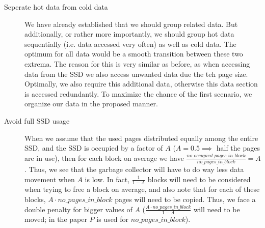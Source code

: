 \documentclass[../../main.tex]{subfiles}
\begin{document}
\begin{description}
    \item[Seperate hot data from cold data] We have already established that we should group related data. But additionally, or rather more importantly, we should group hot data sequentially (i.e. data accessed very often) as well as cold data. The optimum for all data would be a smooth transition between these two extrema. The reason for this is very similar as before, as when accessing data from the SSD we also access unwanted data due the teh page size. Optimally, we also require this additional data, otherwise this data section is accessed redundantly. To maximize the chance of the first scenario, we organize our data in the proposed manner.
    \item[Avoid full SSD usage] When we assume that the used pages distributed equally among the entire SSD, and the SSD is occupied by a factor of $A$ ($A = 0.5 \implies$ half the pages are in use), then for each block on average we have $\frac{no\_occupied\_pages\_in\_block}{no\_pages\_in\_block} = A$. Thus, we see that the garbage collector will have to do way less data movement when $A$ is low. In fact, $\frac{1}{1-A}$ blocks will need to be considered when trying to free a block on average, and also note that for each of these blocks, $A \cdot no\_pages\_in\_block$ pages will need to be copied. Thus, we face a double penalty for bigger values of $A$ ($\frac{A \cdot no\_pages\_in\_block}{1-A}$ will need to be moved; in the paper $P$ is used for $no\_pages\_in\_block$).
\end{description}
\end{document}
